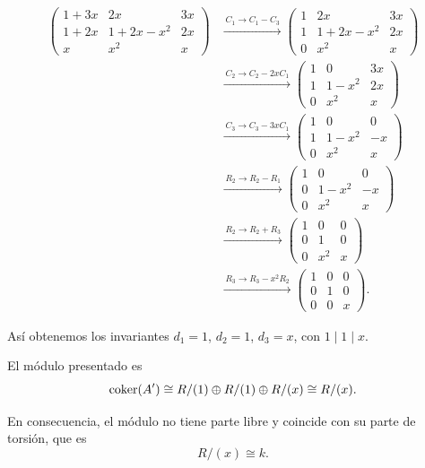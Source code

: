 \begin{sol}
\begin{align*}
\begin{pmatrix}
1+3x & 2x & 3x \\
1+2x & 1+2x - x^{2} & 2x \\
x & x^{2} & x
\end{pmatrix}
&\xrightarrow{\,C_1\to C_1-C_3\,}
\begin{pmatrix}
1 & 2x & 3x \\
1 & 1+2x - x^{2} & 2x \\
0 & x^{2} & x
\end{pmatrix}\\
&\xrightarrow{\,C_2\to C_2-2xC_1\,}
\begin{pmatrix}
1 & 0 & 3x \\
1 & 1 - x^{2} & 2x \\
0 & x^{2} & x
\end{pmatrix}\\
&\xrightarrow{\,C_3\to C_3-3xC_1\,}
\begin{pmatrix}
1 & 0 & 0 \\
1 & 1 - x^{2} & -x \\
0 & x^{2} & x
\end{pmatrix}\\
&\xrightarrow{\,R_2\to R_2-R_1\,}
\begin{pmatrix}
1 & 0 & 0 \\
0 & 1 - x^{2} & -x \\
0 & x^{2} & x
\end{pmatrix}\\
&\xrightarrow{\,R_2\to R_2+R_3\,}
\begin{pmatrix}
1 & 0 & 0 \\
0 & 1 & 0 \\
0 & x^{2} & x
\end{pmatrix}\\
&\xrightarrow{\,R_3\to R_3 - x^{2}R_2\,}
\begin{pmatrix}
1 & 0 & 0 \\
0 & 1 & 0 \\
0 & 0 & x
\end{pmatrix}.
\end{align*}

Así obtenemos los invariantes $d_1 = 1$, $d_2 = 1$, $d_3 = x$, con $1 \mid 1 \mid x$.

El módulo presentado es
\[
\operatorname{coker}(A') \cong R/(1) \oplus R/(1) \oplus R/(x)
\cong R/(x).
\]

En consecuencia, el módulo no tiene parte libre y coincide con su parte de torsión, que es
\[
R/(x) \cong k.
\]
\end{sol}